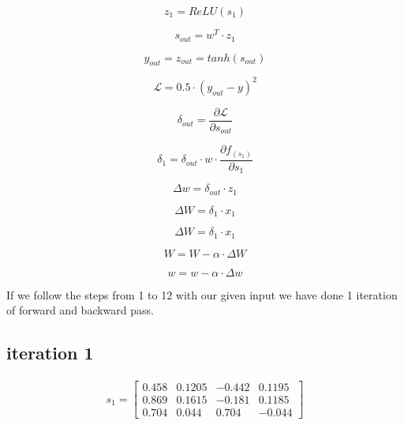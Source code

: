 \documentclass[a4paper]{article}
\begin{document}
\begin{equation}
z_1 = ReLU(s_1)
\end{equation}

\begin{equation}
s_{out} = w^T \cdot z_1
\end{equation}

\begin{equation}
y_{out} = z_{out} = tanh(s_{out})
\end{equation}

\begin{equation}
\mathcal{L} = 0.5 \cdot (y_{out} - y)^2
\end{equation}

\begin{equation}
\delta_{out} = \frac{\partial \mathcal{L}}{\partial s_{out}}
\end{equation}

\begin{equation}
\delta_1 = \delta_{out} \cdot w \cdot \frac{\partial f_{(s_{1})}}{\partial s_{1}}
\end{equation}

\begin{equation}
\Delta w = \delta_{out} \cdot z_1 
\end{equation}

\begin{equation}
\Delta W = \delta_1 \cdot x_1 
\end{equation}

\begin{equation}
\Delta W = \delta_1 \cdot x_1 
\end{equation}

\begin{equation}
W = W - \alpha \cdot \Delta W 
\end{equation}

\begin{equation}
w = w - \alpha \cdot \Delta w 
\end{equation}

If we follow the steps from 1 to 12 with our given input we have done 1 iteration of forward and backward pass.

\subsection{iteration 1}

\begin{gather}s_1 = \begin{bmatrix} 0.458 & 0.1205 & -0.442 & 0.1195 \\ 0.869 & 0.1615 &-0.181 & 0.1185 \\ 0.704 & 0.044 & 0.704 & -0.044 \end{bmatrix}\nonumber \end{gather} 
\end{document}
